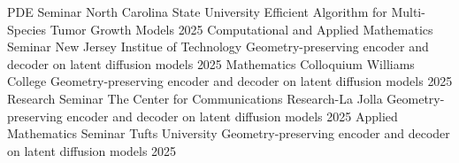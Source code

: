 \begin{cvtalks}
    \cvtalk
    {PDE Seminar} %
    {North Carolina State University}
    {Efficient Algorithm for Multi-Species Tumor Growth Models} %
    {2025} %
\cvtalk
    {Computational and Applied Mathematics Seminar} %
    {New Jersey Institue of Technology}
    {Geometry-preserving encoder and decoder on latent diffusion models} %
    {2025} %
\cvtalk
    {Mathematics Colloquium} %
    {Williams College}
    {Geometry-preserving encoder and decoder on latent diffusion models} %
    {2025} %
\cvtalk
    {Research Seminar} %
    {The Center for Communications Research-La Jolla}
    {Geometry-preserving encoder and decoder on latent diffusion models} %
    {2025} %
\cvtalk
    {Applied Mathematics Seminar} %
    {Tufts University}
    {Geometry-preserving encoder and decoder on latent diffusion models} %
    {2025} %

\end{cvtalks}

